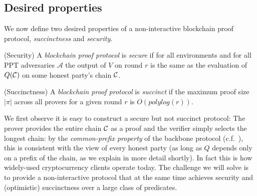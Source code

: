 \subsection{Desired properties}

We now define two desired properties of a non-interactive blockchain proof protocol, \textit{succinctness} and \textit{security}.

\begin{definition}{(Security)}
A \textit{blockchain proof protocol} is \textit{secure} if for all environments
and for all PPT adversaries $\mathcal{A}$ the output of $V$ on round $r$ is the
same as the evaluation of $Q(\mathcal{C})$ on some honest party's chain $\mathcal{C}$.
\end{definition}

\begin{definition}{(Succinctness)}
A \textit{blockchain proof protocol} is \textit{succinct} if the maximum proof
size $|\pi|$ across all provers for a given round $r$ is $O(polylog(r))$.
\end{definition}

We first observe it is easy to construct a secure but not succinct
protocol: The prover provides the entire chain $\mathcal{C}$ as a proof and the
verifier simply selects the longest chain:
by the \emph{common-prefix property} of the backbone protocol (c.f.~\cite{backbone}), this is consistent with
the view of every honest party (as long as $Q$ depends only on a prefix of the chain, as we explain in more detail shortly). In fact this is how widely-used cryptocurrency clients operate today.
The challenge we will solve is to
provide a non-interactive protocol that at the same time achieves security and
(optimistic) succinctness over a large class of predicates.
